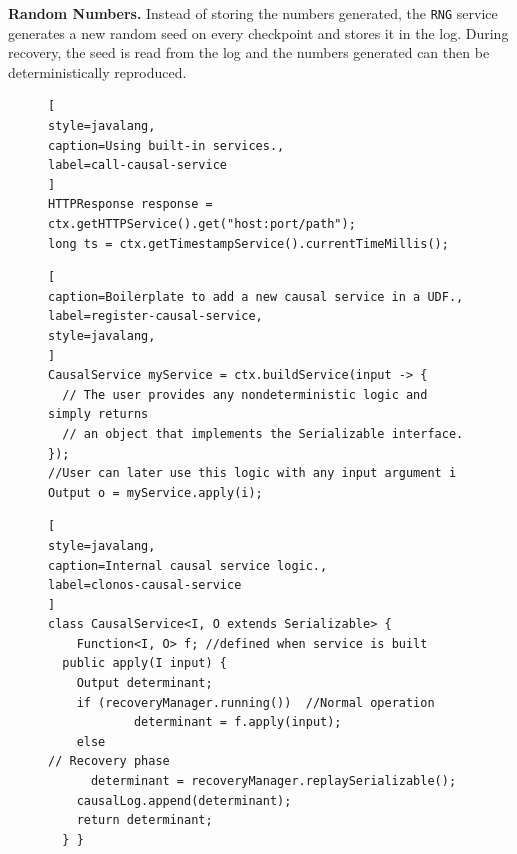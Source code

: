 \documentclass[sigconf]{acmart}
\newcommand{\para}[1]{\vspace{1mm}\noindent\textbf{#1.}}
\begin{document}
\para{Random Numbers} Instead of storing the numbers generated, the \texttt{RNG} service generates a new random seed on every checkpoint and stores it in the log. During recovery, the seed is read from the log and the numbers generated can then be deterministically reproduced.




\begin{figure}[t]
\begin{lstlisting}[
style=javalang,
caption=Using built-in services.,
label=call-causal-service
]
HTTPResponse response = ctx.getHTTPService().get("host:port/path");
long ts = ctx.getTimestampService().currentTimeMillis();
\end{lstlisting}

\begin{lstlisting}[
caption=Boilerplate to add a new causal service in a UDF.,
label=register-causal-service,
style=javalang, 
]
CausalService myService = ctx.buildService(input -> {
  // The user provides any nondeterministic logic and simply returns
  // an object that implements the Serializable interface.
});
//User can later use this logic with any input argument i
Output o = myService.apply(i);
\end{lstlisting}

\begin{lstlisting}[
style=javalang,
caption=Internal causal service logic.,
label=clonos-causal-service
]
class CausalService<I, O extends Serializable> {
	Function<I, O> f; //defined when service is built
  public apply(I input) {
    Output determinant;
    if (recoveryManager.running())	//Normal operation
			determinant = f.apply(input);
    else														// Recovery phase
      determinant = recoveryManager.replaySerializable();
    causalLog.append(determinant); 
    return determinant;
  } }
\end{lstlisting}
\vspace{-8mm}
\end{figure}
\end{document}
